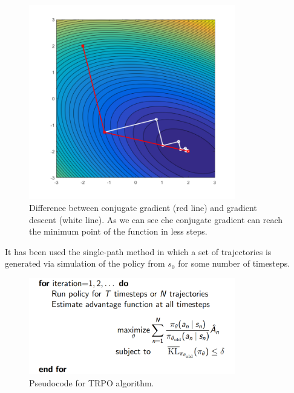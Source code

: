 \documentclass[11pt]{article}
\begin{document}
\begin{figure}[t]
        \includegraphics[width=9cm]{gradient}
        \centering
        \caption{Difference between conjugate gradient (red line) and gradient descent
        (white line). As we can see che conjugate gradient can reach the minimum point of
        the function in less steps.}
        \label{fig:gradient}
\end{figure}



It has been used the single-path method in which a set of trajectories is generated via
simulation of the policy from $s_0$ for some number of timesteps.

\begin{figure}[t]
        \includegraphics[width=9cm]{pseudocode}
        \centering
        \caption{Pseudocode for TRPO algorithm.}
        \label{fig:pseudocode}
\end{figure}
\end{document}
